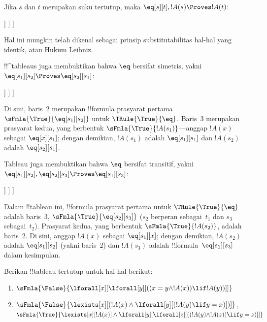 \documentclass[../../../include/open-logic-section]{subfiles}
\begin{document}
\begin{ex}
Jika $s$ dan $t$ merupakan suku tertutup, maka
$\eq[s][t], !A(s) \Proves !A(t)$:
\begin{oltableau}
  [\sFmla{\False}{\formula{A}(t)}, just = \TAss
    [\sFmla{\True}{\eq[s][t]}, just = \TAss
      [\sFmla{\True}{\formula{A}(s)}, just = \TAss
        [\sFmla{\True}{\formula{A}(t)}, just={\TRule{\True}{\eq}[2, 3]}, close]
      ]
    ]
  ]
\end{oltableau}
Hal ini mungkin telah dikenal sebagai prinsip substitutabilitas hal-hal
yang identik, atau Hukum Leibniz.

!!^{tableau}s juga membuktikan bahwa $\eq$ bersifat simetris, yakni
$\eq[s_1][s_2] \Proves \eq[s_2][s_1]$:
\begin{oltableau}
  [\sFmla{\False}{\eq[s_2][s_1]}, just = \TAss
    [\sFmla{\True}{\eq[s_1][s_2]}, just = \TAss
      [\sFmla{\True}{\eq[s_1][s_1]}, just = {$\eq$}
        [\sFmla{\True}{\eq[s_2][s_1]}, just = {\TRule{\True}{\eq}[2, 3]}, close]
      ]
    ]
  ]
\end{oltableau}
Di sini, baris~$2$ merupakan !!{formula} prasyarat pertama
$\sFmla{\True}{\eq[s_1][s_2]}$ untuk $\TRule{\True}{\eq}$. Baris~$3$
merupakan prasyarat kedua, yang berbentuk
$\sFmla{\True}{!A(s_1)}$---anggap $!A(x)$ sebagai $\eq[x][s_1]$; dengan
demikian, $!A(s_1)$ adalah $\eq[s_1][s_1]$ dan $!A(s_2)$ adalah
$\eq[s_2][s_1]$.

Tableau juga membuktikan bahwa $\eq$ bersifat transitif, yakni
$\eq[s_1][s_2], \eq[s_2][s_3] \Proves \eq[s_1][s_3]$:
\begin{oltableau}
  [\sFmla{\False}{\eq[s_1][s_3]}, just = \TAss
    [\sFmla{\True}{\eq[s_1][s_2]}, just = \TAss
      [\sFmla{\True}{\eq[s_2][s_3]}, just = \TAss
        [\sFmla{\True}{\eq[s_1][s_3]}, just = {\TRule{\True}{\eq}[3, 2]}, close]
      ]
    ]
  ]
\end{oltableau}
Dalam !!{tableau} ini, !!{formula} prasyarat pertama untuk
$\TRule{\True}{\eq}$ adalah baris~$3$,
$\sFmla{\True}{\eq[s_2][s_3]}$ ($s_2$ berperan sebagai~$t_1$ dan $s_3$
sebagai~$t_2$). Prasyarat kedua, yang berbentuk
$\sFmla{\True}{!A(s_2)}$, adalah baris~$2$. Di sini, anggap $!A(x)$
sebagai $\eq[s_1][x]$; dengan demikian, $!A(s_2)$ adalah
$\eq[s_1][s_2]$ (yakni baris~$2$) dan $!A(s_3)$ adalah
!!{formula}~$\eq[s_1][s_3]$ dalam kesimpulan.
\end{ex}

\begin{prob}
Berikan !!{tableau} tertutup untuk hal-hal berikut:
\begin{enumerate}
\item $\sFmla{\False}{\lforall[x][\lforall[y][((x = y \land !A(x))
      \lif !A(y))]]}$
\item $\sFmla{\False}{\lexists[x][(!A(x) \land
    \lforall[y][(!A(y) \lif y = x)])]}$,\\
  $\sFmla{\True}{\lexists[x][!A(x)] \land
    \lforall[y][\lforall[z][((!A(y) \land !A(z)) \lif y = z)]]}$
\end{enumerate}
\end{prob}
\end{document}
